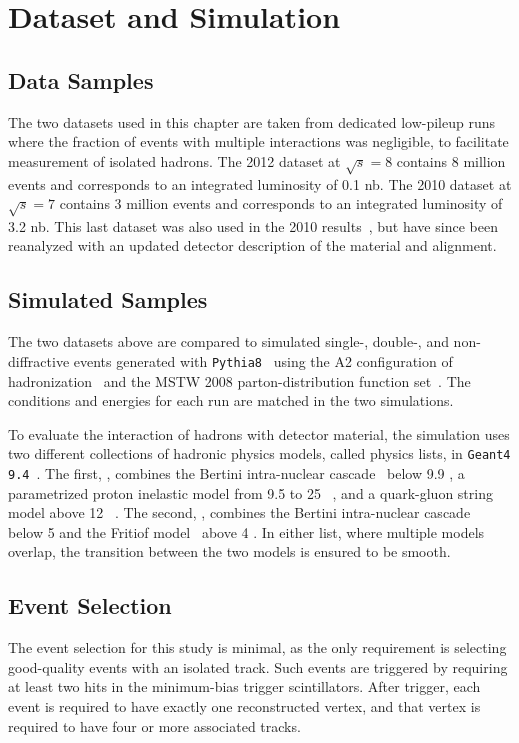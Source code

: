 \section{Dataset and Simulation}

\subsection{Data Samples}
The two datasets used in this chapter are taken from dedicated low-pileup runs where the fraction of events with multiple interactions was negligible, to facilitate measurement of isolated hadrons.
The 2012 dataset at $\sqrt{s} = 8$ \TeV contains 8 million events and corresponds to an integrated luminosity of 0.1 nb.
The 2010 dataset at $\sqrt{s} = 7$ \TeV contains 3 million events and corresponds to an integrated luminosity of 3.2 nb.
This last dataset was also used in the 2010 results~\cite{PERF-2011-05}, but have since been reanalyzed with an updated detector description of the material and alignment.

\subsection{Simulated Samples}
The two datasets above are compared to simulated single-, double-, and non-diffractive events generated with \texttt{Pythia8}~\cite{PYTHIA8} using the A2 configuration of hadronization~\cite{AU2} and the MSTW 2008 parton-distribution function set~\cite{MSTW,MSTW2}.
The conditions and energies for each run are matched in the two simulations.

To evaluate the interaction of hadrons with detector material, the simulation uses two different collections of hadronic physics models, called physics lists, in \texttt{Geant4 9.4}~\cite{G4hadronics}.
The first, \QGSP, combines the Bertini intra-nuclear cascade~\cite{BERT21,BERT22,BERT23} below 9.9 \GeV, a parametrized proton inelastic model from 9.5 to 25 \GeV~\cite{GHEISHA20}, and a quark-gluon string model above 12 \GeV~\cite{QGS15,QGS16,QGS17,QGS18,QGS19}. 
The second, \FTFP, combines the Bertini intra-nuclear cascade~\cite{BERT21,BERT22,BERT23} below 5 \GeV and the Fritiof model~\cite{FTF24,FTF25,FTF26,FTF27} above 4 \GeV.
In either list, where multiple models overlap, the transition between the two models is ensured to be smooth.

\subsection{Event Selection}
\label{sec:inclusive_selection}
The event selection for this study is minimal, as the only requirement is selecting good-quality events with an isolated track. 
Such events are triggered by requiring at least two hits in the minimum-bias trigger scintillators. 
After trigger, each event is required to have exactly one reconstructed vertex, and that vertex is required to have four or more associated tracks.

